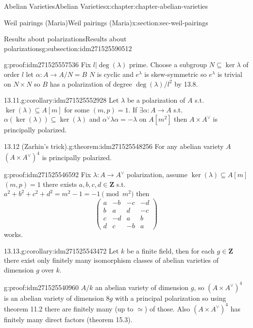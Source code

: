 \documentclass[oneside,10pt,]{book}
\numberwithin{equation}{section}
\newcommand{\lb}{[}
\newcommand{\rb}{]}
\newcommand{\ZZ}{\mathbf{Z}}
\newcommand{\amp}{&}
\begin{document}
\begin{chapterptx}{Abelian Varieties}{}{Abelian Varieties}{}{}{x:chapter:chapter-abelian-varieties}
\begin{sectionptx}{Weil pairings (Maria)}{}{Weil pairings (Maria)}{}{}{x:section:sec-weil-pairings}
\begin{subsectionptx}{Results about polarizations}{}{Results about polarizations}{}{}{g:subsection:idm271525590512}
\begin{proofptx}{}{g:proof:idm271525557536}
Fix \(l |\deg(\lambda)\) prime. Choose a subgroup \(N\subseteq \ker \lambda\) of order \(l\) let \(\alpha \colon A\to A/N = B\) \(N\) is cyclic and \(e^\lambda\) is skew-symmetric so \(e^{\lambda}\) is trivial on \(N\times N\) so \(B\) has a polarization of degree \(\deg(\lambda) / l^2\) by 13.8.%
\end{proofptx}
\begin{corollary}{13.11.}{}{g:corollary:idm271525552928}%
Let \(\lambda\) be a polarization of \(A\) s.t. \(\ker (\lambda) \subseteq A\lb m \rb\) for some \((m,p)=1\). If \(\exists \alpha \colon A \to A\) s.t. \(\alpha(\ker (\lambda)) \subseteq \ker(\lambda)\) and \(\alpha^\vee \lambda \alpha = - \lambda\) on \(A\lb m^2\rb\) then \(A\times A^\vee\) is principally polarized.%
\end{corollary}
\begin{theorem}{13.12 (Zarhin's trick).}{}{g:theorem:idm271525548256}%
For any abelian variety \(A\) \((A\times A^\vee)^4\) is principally polarized.%
\end{theorem}
\begin{proofptx}{}{g:proof:idm271525546592}
Fix \(\lambda \colon A\to A^\vee\) polarization, assume \(\ker (\lambda) \subseteq A\lb m \rb\) \((m, p) = 1\) there exists \(a,b,c,d \in \ZZ\) s.t. \(a^2 + b^2 + c^2 + d^2 = m^2  - 1 = -1 \pmod {m^2}\) then%
\begin{equation*}
\begin{pmatrix} a\amp -b \amp-c\amp -d \\ b\amp a \amp d \amp -c \\ c\amp -d \amp a \amp b \\ d \amp c \amp -b \amp a\end{pmatrix}
\end{equation*}
works.%
\end{proofptx}
\begin{corollary}{13.13.}{}{g:corollary:idm271525543472}%
Let \(k\) be a finite field, then for each \(g \in \ZZ\) there exist only finitely many isomorphism classes of abelian varieties of dimension \(g\) over \(k\).%
\end{corollary}
\begin{proofptx}{}{g:proof:idm271525540960}
\(A/k\) an abelian variety of dimension \(g\), so \((A\times A^\vee)^4\) is an abelian variety of dimension \(8g\) with a principal polarization so using theorem 11.2 there are finitely many (up to \(\simeq\)) of those. Also \((A\times A^\vee)^4\) has finitely many direct factors (theorem 15.3).%
\end{proofptx}

\end{subsectionptx}
\end{sectionptx}
\end{chapterptx}
\end{document}
